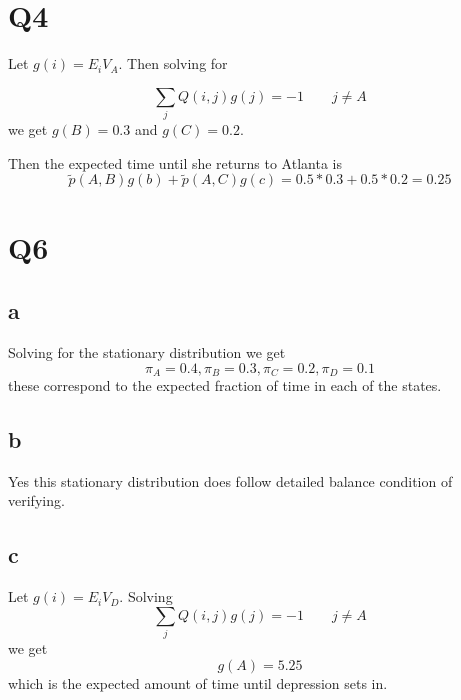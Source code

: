 \documentclass{article}
\begin{document}
\section*{Q4}
Let $g(i) = E_iV_A$. Then solving for

$$
\sum_j Q(i,j)g(j) = -1 \qquad j \neq A
$$
we get $g(B) = 0.3$ and $g(C) = 0.2$.

Then the expected time until she returns to Atlanta is 
$$
\tilde{p}(A,B)g(b) + \tilde{p}(A,C)g(c) = 0.5 * 0.3 + 0.5 * 0.2 = 0.25
$$


\section*{Q6}
\subsection*{a}
Solving for the stationary distribution we get
$$
\pi_A = 0.4, \pi_B = 0.3, \pi_C = 0.2, \pi_D = 0.1
$$
these correspond to the expected fraction of time in each of the states. 

\subsection*{b}
Yes this stationary distribution does follow detailed balance condition of verifying. 

\subsection*{c}
Let $g(i) = E_iV_D$.
Solving 
$$
\sum_j Q(i,j)g(j) = -1 \qquad j \neq A
$$
we get 
$$
g(A) = 5.25
$$
which is the expected amount of time until depression sets in. 
\end{document}

